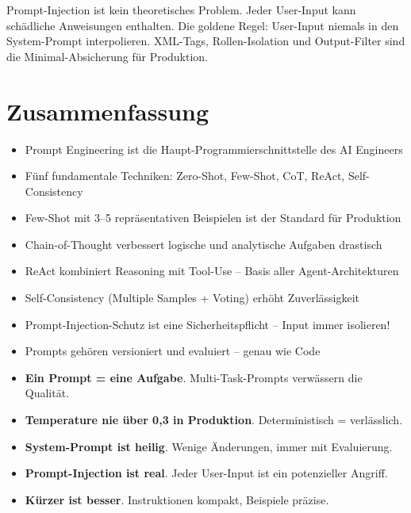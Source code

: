 \begin{praxishinweis}
Prompt-Injection ist kein theoretisches Problem. Jeder User-Input kann schädliche Anweisungen enthalten. Die goldene Regel: User-Input niemals in den System-Prompt interpolieren. XML-Tags, Rollen-Isolation und Output-Filter sind die Minimal-Absicherung für Produktion.
\end{praxishinweis}

\section{Zusammenfassung}

\begin{itemize}[leftmargin=*]
    \item Prompt Engineering ist die Haupt-Programmierschnittstelle des AI Engineers
    \item Fünf fundamentale Techniken: Zero-Shot, Few-Shot, CoT, ReAct, Self-Consistency
    \item Few-Shot mit 3--5 repräsentativen Beispielen ist der Standard für Produktion
    \item Chain-of-Thought verbessert logische und analytische Aufgaben drastisch
    \item ReAct kombiniert Reasoning mit Tool-Use -- Basis aller Agent-Architekturen
    \item Self-Consistency (Multiple Samples + Voting) erhöht Zuverlässigkeit
    \item Prompt-Injection-Schutz ist eine Sicherheitspflicht -- Input immer isolieren!
    \item Prompts gehören versioniert und evaluiert -- genau wie Code
\end{itemize}

\begin{merke}
\begin{itemize}
    \item \textbf{Ein Prompt = eine Aufgabe}. Multi-Task-Prompts verwässern die Qualität.
    \item \textbf{Temperature nie über 0,3 in Produktion}. Deterministisch = verlässlich.
    \item \textbf{System-Prompt ist heilig}. Wenige Änderungen, immer mit Evaluierung.
    \item \textbf{Prompt-Injection ist real}. Jeder User-Input ist ein potenzieller Angriff.
    \item \textbf{Kürzer ist besser}. Instruktionen kompakt, Beispiele präzise.
\end{itemize}
\end{merke}

